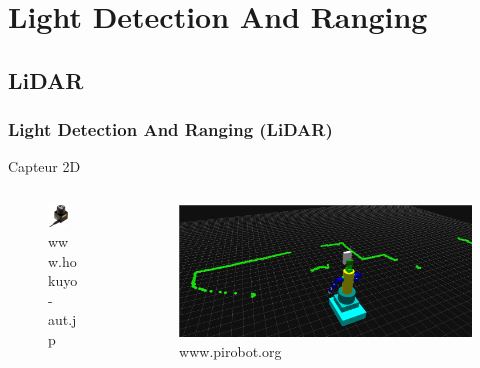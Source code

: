 \section{Light Detection And Ranging}

\subsection{LiDAR}
    \begin{frame}
        \frametitle{Light Detection And Ranging (LiDAR)}
        Capteur 2D
        \begin{columns}[c]                
            \begin{column}{0.5\textwidth}
                \begin{figure}                 
                    \includegraphics[width=0.65\textwidth]{./media/hokuyo.jpg}
                    \caption{www.hokuyo-aut.jp}
                \end{figure}                         
            \end{column} 
                            
            \begin{column}{0.5\textwidth}
                \begin{figure}                 
                    \includegraphics[width=\textwidth]{./media/hokuyo_scan.png}
                    \caption{www.pirobot.org}
                \end{figure}
            \end{column}            
        \end{columns}              
    \end{frame}
    
